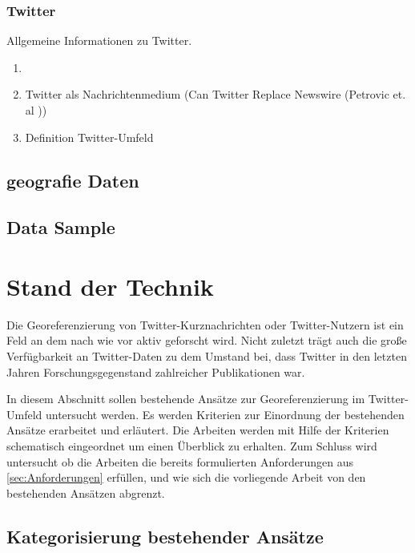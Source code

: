 		\subsection{Twitter}
			Allgemeine Informationen zu Twitter. 
			\begin{enumerate}
			\item {} 
				\item Twitter als Nachrichtenmedium (Can Twitter Replace Newswire (Petrovic et. al ))
				

					\item Definition Twitter-Umfeld
			\end{enumerate} 



	\section{geografie Daten}


	\section{Data Sample}




\chapter{Stand der Technik} 
	Die Georeferenzierung von Twitter-Kurznachrichten oder Twitter-Nutzern ist ein Feld an dem nach wie vor aktiv geforscht wird.
	Nicht zuletzt trägt auch die große Verfügbarkeit an Twitter-Daten zu dem Umstand bei, dass Twitter in den letzten Jahren Forschungsgegenstand zahlreicher Publikationen war. 
	
	In diesem Abschnitt sollen bestehende Ansätze zur Georeferenzierung im Twitter-Umfeld untersucht werden. 
	Es werden Kriterien zur Einordnung der bestehenden Ansätze erarbeitet und erläutert.   
	Die Arbeiten werden mit Hilfe der Kriterien schematisch eingeordnet um einen Überblick zu erhalten. 
	Zum Schluss wird untersucht ob die Arbeiten die bereits formulierten Anforderungen aus \ref{sec:Anforderungen} erfüllen, und wie sich die vorliegende Arbeit von den bestehenden Ansätzen abgrenzt.    

		\section{Kategorisierung bestehender Ansätze}

